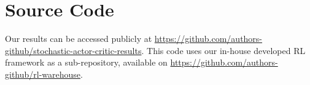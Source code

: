 \documentclass{article}
\begin{document}
\begin{appendices}
\begin{figure}[H]
\begin{minipage}{.5\textwidth}
			
			\label{fig:policy_visual}
		\end{minipage}
	\end{figure}
	
	\section{Source Code}
	\label{app:code}
	Our results can be accessed publicly at \url{https://github.com/authors-github/stochastic-actor-critic-results}. This code uses our in-house developed RL framework as a sub-repository, available on \url{https://github.com/authors-github/rl-warehouse}. 
	
\end{appendices}
\end{document}
